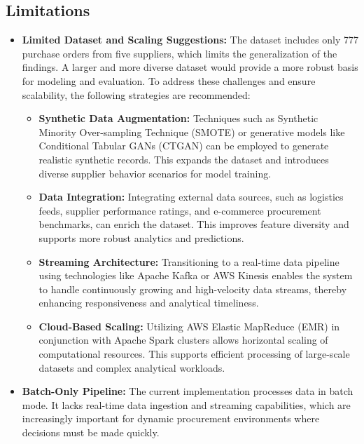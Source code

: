 \documentclass[10pt, twocolumn]{article}
\begin{document}
\subsection*{Limitations}
\begin{itemize}
    \item \textbf{Limited Dataset and Scaling Suggestions:} The dataset includes only 777 purchase orders from five suppliers, which limits the generalization of the findings. A larger and more diverse dataset would provide a more robust basis for modeling and evaluation.
    To address these challenges and ensure scalability, the following strategies are recommended:
    
    \begin{itemize}
        \item \textbf{Synthetic Data Augmentation:} Techniques such as Synthetic Minority Over-sampling Technique (SMOTE) or generative models like Conditional Tabular GANs (CTGAN) can be employed to generate realistic synthetic records. This expands the dataset and introduces diverse supplier behavior scenarios for model training.
        
        \item \textbf{Data Integration:} Integrating external data sources, such as logistics feeds, supplier performance ratings, and e-commerce procurement benchmarks, can enrich the dataset. This improves feature diversity and supports more robust analytics and predictions.
        
        \item \textbf{Streaming Architecture:} Transitioning to a real-time data pipeline using technologies like Apache Kafka or AWS Kinesis enables the system to handle continuously growing and high-velocity data streams, thereby enhancing responsiveness and analytical timeliness.
        
        \item \textbf{Cloud-Based Scaling:} Utilizing AWS Elastic MapReduce (EMR) in conjunction with Apache Spark clusters allows horizontal scaling of computational resources. This supports efficient processing of large-scale datasets and complex analytical workloads.
    \end{itemize}

    \item \textbf{Batch-Only Pipeline:} The current implementation processes data in batch mode. It lacks real-time data ingestion and streaming capabilities, which are increasingly important for dynamic procurement environments where decisions must be made quickly.


\end{itemize}
\end{document}
